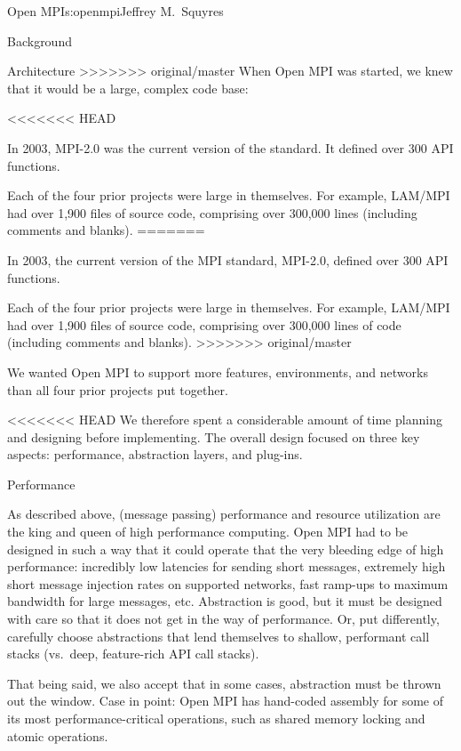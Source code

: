 \begin{aosachapter}{Open MPI}{s:openmpi}{Jeffrey M.\ Squyres}
\begin{aosasect1}{Background}
\begin{aosasect1}{Architecture}
>>>>>>> original/master
When Open MPI was started, we knew that it would be a large, complex
code base:

\begin{aosaitemize}
<<<<<<< HEAD
\item In 2003, MPI-2.0 was the current version of the standard.  It
  defined over 300 API functions.
\item Each of the four prior projects were large in themselves.  For
  example, LAM/MPI had over 1,900 files of source code, comprising
  over 300,000 lines (including comments and blanks).
=======
\item In 2003, the current version of the MPI standard, MPI-2.0,
  defined over 300 API functions.
\item Each of the four prior projects were large in themselves.  For
  example, LAM/MPI had over 1,900 files of source code, comprising
  over 300,000 lines of code (including comments and blanks).
>>>>>>> original/master
\item We wanted Open MPI to support more features, environments, and
  networks than all four prior projects put together.
\end{aosaitemize}

<<<<<<< HEAD
We therefore spent a considerable amount of time planning and
designing before implementing.  The overall design focused on three
key aspects: performance, abstraction layers, and plug-ins.


\begin{aosasect2}{Performance}

As described above, (message passing) performance and resource
utilization are the king and queen of high performance computing.
%
Open MPI had to be designed in such a way that it could operate that
the very bleeding edge of high performance: incredibly low latencies
for sending short messages, extremely high short message injection
rates on supported networks, fast ramp-ups to maximum bandwidth for
large messages, etc.  Abstraction is good, but it must be designed
with care so that it does not get in the way of performance.  Or, put
differently, carefully choose abstractions that lend themselves to
shallow, performant call stacks (vs.\ deep, feature-rich API call
stacks).

That being said, we also accept that in some cases, abstraction must
be thrown out the window.  Case in point: Open MPI has hand-coded
assembly for some of its most performance-critical operations, such as
shared memory locking and atomic operations.


\end{aosasect2}
\end{aosasect1}
\end{aosasect1}
\end{aosachapter}
